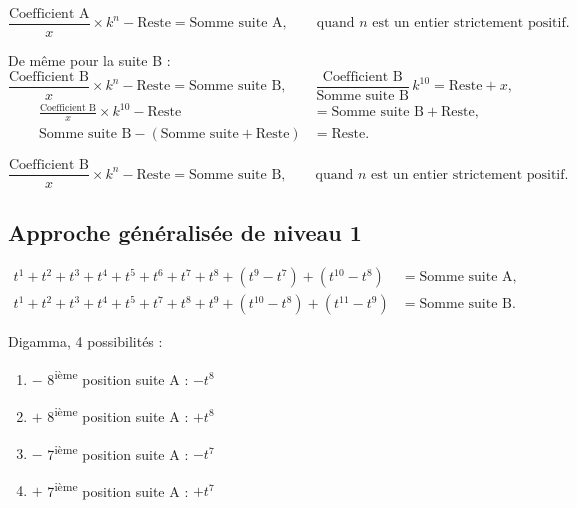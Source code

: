 \documentclass[11pt,a4paper]{article}
\begin{document}
\begin{boiteformule}
\[
\frac{\text{Coefficient A}}{x} \times k^{n} - \text{Reste} = \text{Somme suite A},
\qquad \text{quand } n \text{ est un entier strictement positif.}
\]
\end{boiteformule}

De même pour la suite B :
\[
\frac{\text{Coefficient B}}{x} \times k^{n} - \text{Reste} = \text{Somme suite B},
\qquad
\frac{\text{Coefficient B}}{\text{Somme suite B}}\, k^{10} = \text{Reste} + x ,
\]
\begin{align*}
\frac{\text{Coefficient B}}{x}\times k^{10}-\text{Reste}
&=\text{Somme suite B}+\text{Reste},\\
\text{Somme suite B}-(\text{Somme suite}+\text{Reste})
&=\text{Reste}.
\end{align*}

\begin{boiteformule}
\[
\frac{\text{Coefficient B}}{x} \times k^{n} - \text{Reste} = \text{Somme suite B},
\qquad \text{quand } n \text{ est un entier strictement positif.}
\]
\end{boiteformule}

\subsection{Approche généralisée de niveau 1}

\begin{boiteformule}[Sommes des suites A et B (forme formelle, $n = 10$)]
\begin{align*}
t^{1}+t^{2}+t^{3}+t^{4}+t^{5}+t^{6}+t^{7}+t^{8}+(t^{9}-t^{7})+(t^{10}-t^{8}) &= \text{Somme suite A},\\
t^{1}+t^{2}+t^{3}+t^{4}+t^{5}+t^{7}+t^{8}+t^{9}+(t^{10}-t^{8})+(t^{11}-t^{9}) &= \text{Somme suite B}.
\end{align*}
\end{boiteformule}

Digamma, 4 possibilités :
\begin{enumerate}[nosep]
  \item $-$ 8\textsuperscript{ième} position suite A : $-t^{8}$
  \item $+$ 8\textsuperscript{ième} position suite A : $+t^{8}$
  \item $-$ 7\textsuperscript{ième} position suite A : $-t^{7}$
  \item $+$ 7\textsuperscript{ième} position suite A : $+t^{7}$
\end{enumerate}
\end{document}
